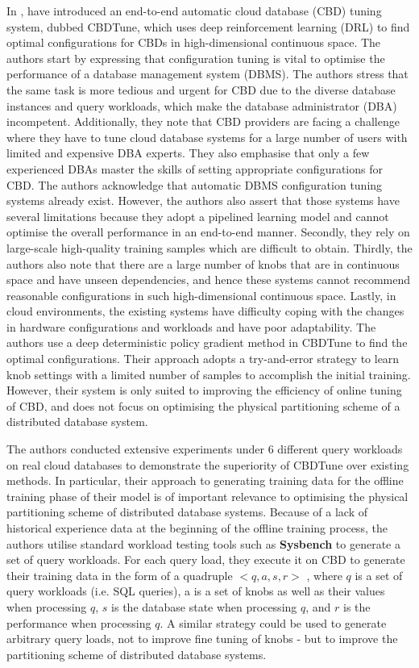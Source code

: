 In \cite{DBLP:conf/sigmod/ZhangLZLXCXWCLR19}, \citeauthor{DBLP:conf/sigmod/ZhangLZLXCXWCLR19} have introduced an end-to-end automatic cloud database (CBD) tuning system, dubbed CBDTune, which uses deep reinforcement learning (DRL) to find optimal configurations for CBDs in high-dimensional continuous space. The authors start by expressing that configuration tuning is vital to optimise the performance of a database management system (DBMS). The authors stress that the same task is more tedious and urgent for CBD due to the diverse database instances and query workloads, which make the database administrator (DBA) incompetent. Additionally, they note that CBD providers are facing a challenge where they have to tune cloud database systems for a large number of users with limited and expensive DBA experts. They also emphasise that only a few experienced DBAs master the skills of setting appropriate configurations for CBD. The authors acknowledge that automatic DBMS configuration tuning systems already exist. However, the authors also assert that those systems have several limitations because they adopt a pipelined learning model and cannot optimise the overall performance in an end-to-end manner. Secondly, they rely on large-scale high-quality training samples which are difficult to obtain. Thirdly, the authors also note that there are a large number of knobs that are in continuous space and have unseen dependencies, and hence these systems cannot recommend reasonable configurations in such high-dimensional continuous space. Lastly, in cloud environments, the existing systems have difficulty coping with the changes in hardware configurations and workloads and have poor adaptability. 
The authors use a deep deterministic policy gradient method in CBDTune to find the optimal configurations. Their approach adopts a try-and-error strategy to learn knob settings with a limited number of samples to accomplish the initial training. However, their system is only suited to improving the efficiency of online tuning of CBD, and does not focus on optimising the physical partitioning scheme of a distributed database system. 

The authors conducted extensive experiments under 6 different query workloads on real cloud databases to demonstrate the superiority of CBDTune over existing methods. In particular, their approach to generating training data for the offline training phase of their model is of important relevance to optimising the physical partitioning scheme of distributed database systems. Because of a lack of historical experience data at the beginning of the offline training process, the authors utilise standard workload testing tools such as \textbf{Sysbench} to generate a set of query workloads. For each query load, they execute it on CBD to generate their training data in the form of a quadruple $<q, a, s, r>$ , where $q$ is a set of query workloads (i.e. SQL queries), a is a set of knobs as well as their values when processing $q$, $s$ is the database state when processing $q$, and $r$ is the performance when processing $q$. A similar strategy could be used to generate arbitrary query loads, not to improve fine tuning of knobs - but to improve the partitioning scheme of distributed database systems.

